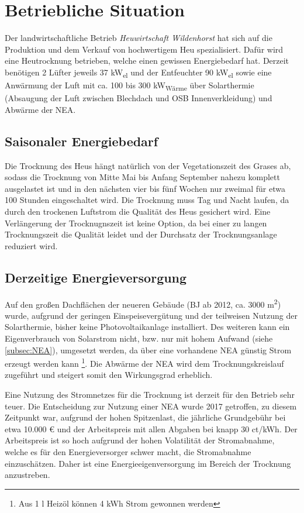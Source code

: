 \documentclass[11pt]{scrartcl}
\begin{document}
\section{Betriebliche Situation}
\label{sec:betrieb}

Der landwirtschaftliche Betrieb \textit{Heuwirtschaft Wildenhorst} hat sich auf die Produktion und dem Verkauf von hochwertigem Heu spezialisiert.
Dafür wird eine Heutrocknung betrieben, welche einen gewissen Energiebedarf hat.
Derzeit benötigen 2 Lüfter jeweils 37 kW\textsubscript{el} und der Entfeuchter 90 kW\textsubscript{el} sowie eine Anwärmung der Luft mit ca. 100 bis 300 kW\textsubscript{Wärme} über Solarthermie (Absaugung der Luft zwischen Blechdach und OSB Innenverkleidung) und Abwärme der \ac{NEA}.

\subsection{Saisonaler Energiebedarf}
Die Trocknung des Heus hängt natürlich von der Vegetationszeit des Grases ab, sodass die Trocknung von Mitte Mai bis Anfang September nahezu komplett ausgelastet ist und in den nächsten vier bis fünf Wochen nur zweimal für etwa 100 Stunden eingeschaltet wird.
Die Trocknung muss Tag und Nacht laufen, da durch den trockenen Luftstrom die Qualität des Heus gesichert wird.
Eine Verlängerung der Trocknugnszeit ist keine Option, da bei einer zu langen Trocknungszeit die Qualität leidet und der Durchsatz der Trocknungsanlage reduziert wird.

\subsection{Derzeitige Energieversorgung}
Auf den großen Dachflächen der neueren Gebäude (BJ ab 2012, ca. 3000 m\textsuperscript{2}) wurde, aufgrund der geringen Einspeisevergütung und der teilweisen Nutzung der Solarthermie, bisher keine Photovoltaikanlage installiert.
Des weiteren kann ein Eigenverbrauch von Solarstrom nicht, bzw. nur mit hohem Aufwand (siehe \cref{subsec:NEA}), umgesetzt werden, da über eine vorhandene \ac{NEA} günstig Strom erzeugt werden kann \footnote{Aus 1 l Heizöl können 4 kWh Strom gewonnen werden}.
Die Abwärme der \ac{NEA} wird dem Trocknungskreislauf zugeführt und steigert somit den Wirkungsgrad erheblich.

Eine Nutzung des Stromnetzes für die Trocknung ist derzeit für den Betrieb sehr teuer.
Die Entscheidung zur Nutzung einer \ac{NEA} wurde 2017 getroffen, zu diesem Zeitpunkt war, aufgrund der hohen Spitzenlast, die jährliche Grundgebühr bei etwa 10.000 € und der Arbeitspreis mit allen Abgaben bei knapp 30 ct/kWh.
Der Arbeitspreis ist so hoch aufgrund der hohen Volatilität der Stromabnahme, welche es für den Energieversorger schwer macht, die Stromabnahme einzuschätzen.
Daher ist eine Energieeigenversorgung im Bereich der Trocknung anzustreben.
\end{document}
